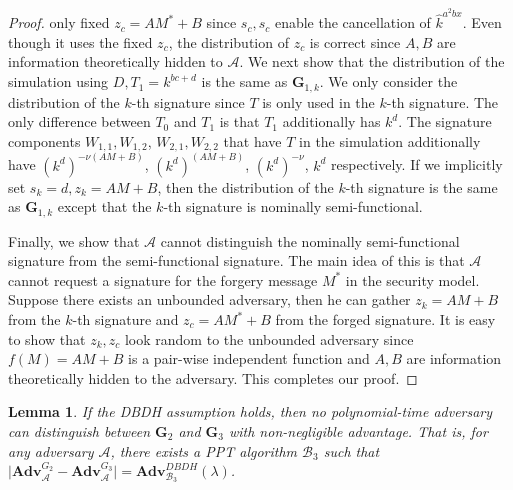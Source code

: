 \documentclass[11pt,letterpaper]{article}
\newtheorem{lemma}[theorem]{Lemma}
\newcommand{\Adv}{\textbf{Adv}}
\newcommand{\mc}[1]{\mathcal{#1}}
\newcommand{\tb}[1]{\textbf{#1}}
\begin{document}
\begin{proof}
only fixed $z_c = AM^* + B$ since $s_c, s_c$ enable the cancellation of
$\hat{k}^{a^2 b x}$. Even though it uses the fixed $z_c$, the distribution of
$z_c$ is correct since $A,B$ are information theoretically hidden to
$\mc{A}$.
We next show that the distribution of the simulation using $D, T_1 =
k^{bc+d}$ is the same as $\tb{G}_{1,k}$. We only consider the distribution of
the $k$-th signature since $T$ is only used in the $k$-th signature. The only
difference between $T_0$ and $T_1$ is that $T_1$ additionally has $k^d$. The
signature components $W_{1,1}, W_{1,2}$, $W_{2,1}, W_{2,2}$ that have $T$ in
the simulation additionally have $(k^d)^{-\nu (AM+B)}$, $(k^d)^{(AM+B)}$,
$(k^d)^{-\nu}$, $k^d$ respectively. If we implicitly set $s_k = d, z_k =
AM+B$, then the distribution of the $k$-th signature is the same as
$\tb{G}_{1,k}$ except that the $k$-th signature is nominally semi-functional.

Finally, we show that $\mc{A}$ cannot distinguish the nominally
semi-functional signature from the semi-functional signature. The main idea
of this is that $\mc{A}$ cannot request a signature for the forgery message
$M^*$ in the security model. Suppose there exists an unbounded adversary,
then he can gather $z_k = AM + B$ from the $k$-th signature and $z_c = AM^* +
B$ from the forged signature. It is easy to show that $z_k, z_c$ look random
to the unbounded adversary since $f(M) = AM + B$ is a pair-wise independent
function and $A, B$ are information theoretically hidden to the adversary.
This completes our proof.
\end{proof}

\begin{lemma} \label{lem:pks2-prime-3}
If the DBDH assumption holds, then no polynomial-time adversary can
distinguish between $\tb{G}_2$ and $\tb{G}_3$ with non-negligible advantage.
That is, for any adversary $\mc{A}$, there exists a PPT algorithm $\mc{B}_3$
such that
    $\big| \Adv_{\mc{A}}^{G_2} - \Adv_{\mc{A}}^{G_3} \big| =
    \Adv_{\mc{B}_3}^{DBDH}(\lambda)$.
\end{lemma}
\end{document}
